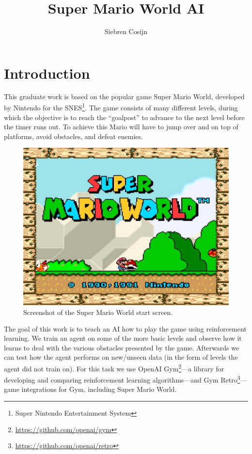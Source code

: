 \documentclass[a4paper]{article}
\title{Super Mario World AI}
\author{Siebren Cosijn}
\date{\displaydate{date}}
\begin{document}
\maketitle

\section{Introduction} \label{s:introduction}
This graduate work is based on the popular game Super Mario World, developed by Nintendo for the SNES\footnote{Super Nintendo Entertainment System}.
The game consists of many different levels, during which the objective is to reach the ``goalpost'' to advance to the next level before the timer runs out.
To achieve this Mario will have to jump over and on top of platforms, avoid obstacles, and defeat enemies.
\begin{figure}[htbp]
    \centering
    \includegraphics[width=.6\textwidth]{start-screen}
    \caption{Screenshot of the Super Mario World start screen.}
    \label{fig:smw}
\end{figure}

The goal of this work is to teach an AI how to play the game using reinforcement learning.
We train an agent on some of the more basic levels and observe how it learns to deal with the various obstacles presented by the game.
Afterwards we can test how the agent performs on new/unseen data (in the form of levels the agent did not train on).
For this task we use OpenAI Gym\footnote{\url{https://github.com/openai/gym}}---a library for developing and comparing reinforcement learning algorithms---and Gym Retro\footnote{\url{https://github.com/openai/retro}}---game integrations for Gym, including Super Mario World.
\end{document}
